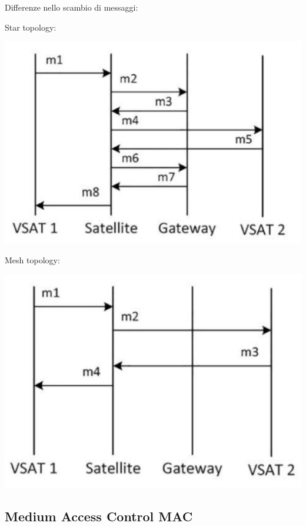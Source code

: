 Differenze nello scambio di messaggi:
\begin{center}
	\begin{minipage}{0.48\linewidth}
		Star topology:
		\begin{center}
			\includegraphics[width=\linewidth]{img/sat/startop}
		\end{center}
	\end{minipage}
	\hfill
	\begin{minipage}{0.48\linewidth}
		Mesh topology:
		\begin{center}
			\includegraphics[width=\linewidth]{img/sat/meshtop}
		\end{center}
	\end{minipage}
\end{center}

\subsection{Medium Access Control MAC}

